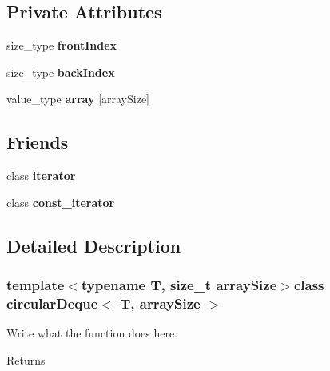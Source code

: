 \subsection*{Private Attributes}
\begin{DoxyCompactItemize}
\item 
\hypertarget{classcircularDeque_af64b4fbb5045a74a52c9d088c01111bf}{size\+\_\+type {\bfseries front\+Index}}\label{classcircularDeque_af64b4fbb5045a74a52c9d088c01111bf}

\item 
\hypertarget{classcircularDeque_adb67745fe0b548b805863c34762f27e2}{size\+\_\+type {\bfseries back\+Index}}\label{classcircularDeque_adb67745fe0b548b805863c34762f27e2}

\item 
\hypertarget{classcircularDeque_a554afa6a60a471cd9f6be80ca6605590}{value\+\_\+type {\bfseries array} \mbox{[}array\+Size\mbox{]}}\label{classcircularDeque_a554afa6a60a471cd9f6be80ca6605590}

\end{DoxyCompactItemize}
\subsection*{Friends}
\begin{DoxyCompactItemize}
\item 
\hypertarget{classcircularDeque_a67171474c4da6cc8efe0c7fafefd2b2d}{class {\bfseries iterator}}\label{classcircularDeque_a67171474c4da6cc8efe0c7fafefd2b2d}

\item 
\hypertarget{classcircularDeque_ac220ce1c155db1ac44146c12d178056f}{class {\bfseries const\+\_\+iterator}}\label{classcircularDeque_ac220ce1c155db1ac44146c12d178056f}

\end{DoxyCompactItemize}


\subsection{Detailed Description}
\subsubsection*{template$<$typename T, size\+\_\+t array\+Size$>$class circular\+Deque$<$ T, array\+Size $>$}

Write what the function does here. 

\begin{DoxyReturn}{Returns}

\end{DoxyReturn}


